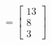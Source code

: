 \documentclass[preview]{standalone}
\begin{document}
\begin{align*}
=\begin{bmatrix} 13 \\ 8 \\ 3 \end{bmatrix}
\end{align*}
\end{document}
